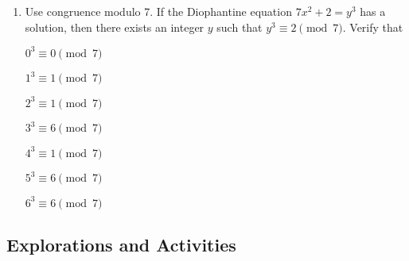 \begin{enumerate}
\item Use congruence modulo 7.  If the Diophantine equation $7x^2 + 2 = y^3$ has a solution, then there exists an integer $y$ such that $y^3 \equiv 2 \pmod 7$.  Verify that
\begin{multicols}{3}
$0^3 \equiv 0 \pmod 7$

$1^3 \equiv 1 \pmod 7$

$2^3 \equiv 1 \pmod 7$

$3^3 \equiv 6 \pmod 7$

$4^3 \equiv 1 \pmod 7$

$5^3 \equiv 6 \pmod 7$

$6^3 \equiv 6 \pmod 7$
\end{multicols}
\end{enumerate}


\subsection*{Explorations and Activities}
\setcounter{oldenumi}{\theenumi}
